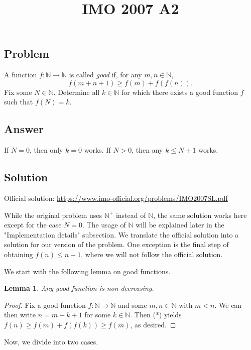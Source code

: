 \documentclass{article}
\title{IMO 2007 A2}
\author{}
\date{}
\newcommand{\N}{\mathbb{N}}
\newtheorem{lemma}{Lemma}
\begin{document}
\maketitle



\subsection*{Problem}

A function $f : \N \to \N$ is called \textit{good} if, for any $m, n \in \N$,
\[ f(m + n + 1) \geq f(m) + f(f(n)). \tag{*} \]
Fix some $N \in \N$.
Determine all $k \in \N$ for which there exists a good function $f$ such that $f(N) = k$.



\subsection*{Answer}

If $N = 0$, then only $k = 0$ works.
If $N > 0$, then any $k \leq N + 1$ works.



\subsection*{Solution}

Official solution: \url{https://www.imo-official.org/problems/IMO2007SL.pdf}

While the original problem uses $\N^+$ instead of $\N$, the same solution works here except for the case $N = 0$.
The usage of $\N$ will be explained later in the "Implementation details" subsection.
We translate the official solution into a solution for our version of the problem.
One exception is the final step of obtaining $f(n) \leq n + 1$, where we will not follow the official solution.

We start with the following lemma on good functions.

\begin{lemma}\label{lem1}
Any good function is non-decreasing.
\end{lemma}
\begin{proof}
Fix a good function $f : \N \to \N$ and some $m, n \in \N$ with $m < n$.
We can then write $n = m + k + 1$ for some $k \in \N$.
Then (*) yields $f(n) \geq f(m) + f(f(k)) \geq f(m)$, as desired.
\end{proof}

Now, we divide into two cases.
\end{document}
